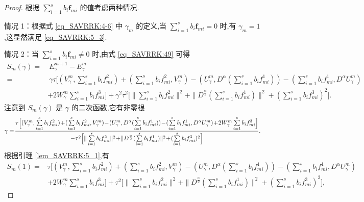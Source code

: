 \begin{proof}
根据 $\sum\limits_{i=1}^s b_i \bm{f}_{m i}$ 的值考虑两种情况.

情况 1：根据式 \eqref{eq_SAVRRK:4-6} 中 $\gamma_m$ 的定义,当 $\sum\limits_{i=1}^s b_i \bm{f}_{m i} = 0$ 时,有 $\gamma_m = 1$,这显然满足 \eqref{eq_SAVRRK:5_3}.

情况 2：当 $\sum\limits_{i=1}^s b_i \bm{f}_{m i} \neq 0$ 时,由式 \eqref{eq_SAVRRK:49} 可得
\begin{align}\label{eq_SAVRRK:5_4a}
	S_m(\gamma)=&~E_{\gamma}^{m+1}-E_{\gamma}^{m}\nonumber\\
	=&~\gamma\tau\Big[(V_{\gamma}^{m},\sum\limits_{i=1}^{s}b_if_{mi}^2)+(\sum\limits_{i=1}^{s}b_if_{mi}^2,V_{\gamma}^{m})-(U_{\gamma}^{m},D^{\alpha} (\sum\limits_{i=1}^{s}b_if_{mi}^1))-(\sum\limits_{i=1}^{s}b_if_{mi}^1, D^{\alpha} U_{\gamma}^{m})\nonumber\\
	&+2W_{\gamma}^{m}\sum\limits_{i=1}^{s}b_if_{mi}^3\Big]+\gamma^2\tau^2\Big[\|\sum\limits_{i=1}^{s}b_if_{mi}^2\|^2+ \|D^\frac{\alpha}{2}(\sum\limits_{i=1}^{s}b_if_{mi}^1)\|^2+(\sum\limits_{i=1}^{s}b_if_{mi}^3)^2\Big].
\end{align}
注意到 $S_m(\gamma)$ 是 $\gamma$ 的二次函数,它有非零根
\begin{equation}\label{eq_SAVRRK:5_4a3}\small
	\gamma=\!\frac{\tau\Big[(V_{\gamma}^{m},\sum\limits_{i=1}^{s}b_if_{mi}^2)\!+\!(\sum\limits_{i=1}^{s}b_if_{mi}^2,V_{\gamma}^{m})\!-\!(U_{\gamma}^{m},D^{\alpha} (\sum\limits_{i=1}^{s}b_if_{mi}^1))\!-\!(\sum\limits_{i=1}^{s}b_if_{mi}^1, D^{\alpha} U_{\gamma}^{m})\!+\!2W_{\gamma}^{m}\sum\limits_{i=1}^{s}b_if_{mi}^3\Big]}{-\tau^2\Big[\|\sum\limits_{i=1}^{s}b_if_{mi}^2\|^2\!+\! \|D^\frac{\alpha}{2}(\sum\limits_{i=1}^{s}b_if_{mi}^1)\|^2\!+\!(\sum\limits_{i=1}^{s}b_if_{mi}^3)^2\Big]}.
\end{equation}
根据引理 \ref{lem_SAVRRK:5_1},有
\begin{align}\label{eq_SAVRRK:5_4a2}
	S_m(1)=&\tau\Big[(V_{\gamma}^{m},\sum\limits_{i=1}^{s}b_if_{mi}^2)+(\sum\limits_{i=1}^{s}b_if_{mi}^2,V_{\gamma}^{m})-(U_{\gamma}^{m},D^{\alpha} (\sum\limits_{i=1}^{s}b_if_{mi}^1))-(\sum\limits_{i=1}^{s}b_if_{mi}^1, D^{\alpha} U_{\gamma}^{m})\nonumber\\
	&+2W_{\gamma}^{m}\sum\limits_{i=1}^{s}b_if_{mi}^3\Big]+\tau^2\Big[\|\sum\limits_{i=1}^{s}b_if_{mi}^2\|^2+ \|D^\frac{\alpha}{2}(\sum\limits_{i=1}^{s}b_if_{mi}^1)\|^2+(\sum\limits_{i=1}^{s}b_if_{mi}^3)^2\Big],

\end{align}
\end{proof}

